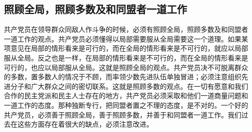\documentclass[cn,11pt,chinese]{elegantbook}
\def\myformat#1{\hfil\hfil #1}
\begin{document}
\subsection*{\myformat{照顾全局，照顾多数及和同盟者一道工作}}
共产党员在领导群众同敌人作斗争的时候，必须有照顾全局，照顾多数及和同盟者一道工作的观点。共产党员必须懂得以局部需要服从全局需要这一个道理。如果某项意见在局部的情形看来是可行的，而在全局的情形看来是不可行的，就应以局部服从全局。反之也是一样，在局部的情形看来是不可行的，而在全局的情形看来是可行的，也应以局部服从全局。这就是照顾全局的观点。共产党员决不可脱离群众的多数，置多数人的情况于不顾，而率领少数先进队伍单独冒进；必须注意组织先进分子和广大群众之间的密切联系。这就是照顾多数的观点。在一切有愿意和我们合作的民主党派和民主人士存在的地方，共产党员必须采取和他们一道商量问题和一道工作的态度。那种独断专行，把同盟者置之不理的态度，是不对的。一个好的共产党员，必须善于照顾全局，善于照顾多数，并善于和同盟者一道工作。我们过去在这些方面存在着很大的缺点，必须注意改进。\\
\end{document}

